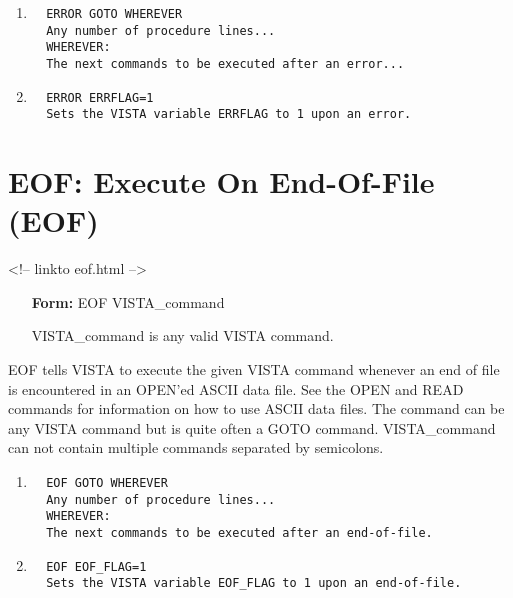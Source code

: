 \begin{enumerate}
  \item{
\begin{verbatim}
  ERROR GOTO WHEREVER
  Any number of procedure lines...
  WHEREVER:
  The next commands to be executed after an error...
\end{verbatim}
}
  \item{
\begin{verbatim}
  ERROR ERRFLAG=1
  Sets the VISTA variable ERRFLAG to 1 upon an error.
\end{verbatim}
}
\end{enumerate}

\section{EOF: Execute On End-Of-File (EOF)}
\begin{rawhtml}
<!-- linkto eof.html -->
\end{rawhtml}

\begin{itemize}
  \item[\textbf{Form: } EOF  VISTA\_command\hfill]{}
  \item[VISTA\_command]{is any valid VISTA command.}
\end{itemize}
EOF tells VISTA to execute the given VISTA command whenever an end of file
is encountered in an OPEN'ed ASCII data file. See the OPEN and READ
commands for information on how to use ASCII data files. The command can be
any VISTA command but is quite often a GOTO command.  VISTA\_command can
not contain multiple commands separated by semicolons.

\begin{enumerate}
  \item{
\begin{verbatim}
  EOF GOTO WHEREVER
  Any number of procedure lines...
  WHEREVER:
  The next commands to be executed after an end-of-file.
\end{verbatim}
}
  \item{
\begin{verbatim}
  EOF EOF_FLAG=1
  Sets the VISTA variable EOF_FLAG to 1 upon an end-of-file.
\end{verbatim}
}
\end{enumerate}
